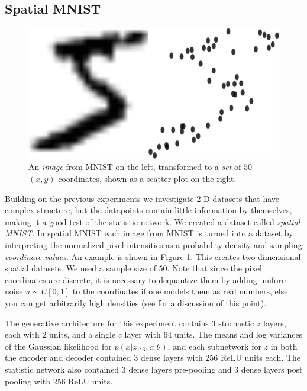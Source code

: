\documentclass{article} %
\begin{document}
\subsection{Spatial MNIST}
\begin{figure}
\centering
\includegraphics[width=0.6\linewidth]{joint_mnist_sample.png}
\caption{An \emph{image} from MNIST on the left, transformed to a \emph{set} of  $50$ $(x,y)$ coordinates, shown as a scatter plot on the right. \label{fig:spatial_mnist_sampling}}

\end{figure}
Building on the previous experiments we investigate 2-D datasets that have complex structure, but the datapoints contain little information by themselves, making it a good test of the statistic network. We created a dataset called \emph{spatial MNIST}. In spatial MNIST each image from MNIST \citep{mnist} is turned into a dataset by interpreting the normalized pixel intensities as a probability density and sampling \emph{coordinate values}. An example is shown in Figure \ref{fig:spatial_mnist_sampling}. This creates two-dimensional spatial datasets. We used a sample size of $50$. Note that since the pixel coordinates are discrete, it is necessary to dequantize them by adding uniform noise $u \sim U[0,1]$ to the coordinates if one models them as real numbers, else you can get arbitrarily high densities (see \citet{note_evaluation_generative} for a discussion of this point).

The generative architecture for this experiment contains $3$ stochastic $z$ layers, each with $2$ units, and a single $c$ layer with $64$ units. The means and log variances of the Gaussian likelihood for $p(x|z_{1:3},c ;\theta)$, and each subnetwork for $z$ in both the encoder and decoder contained $3$ dense layers with $256$ ReLU units each. The statistic network also contained 3 dense layers pre-pooling and 3 dense layers post pooling with 256 ReLU units.
\end{document}
